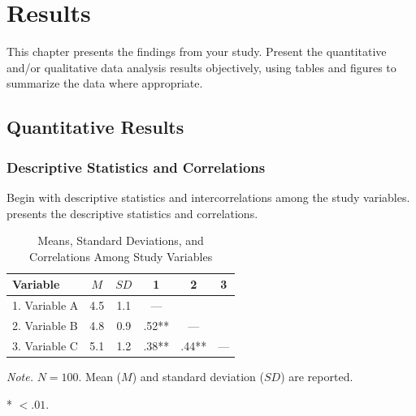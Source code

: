 
\section{Results}

This chapter presents the findings from your study. Present the quantitative and/or qualitative data analysis results objectively, using tables and figures to summarize the data where appropriate.

\subsection{Quantitative Results}

\subsubsection{Descriptive Statistics and Correlations}
Begin with descriptive statistics and intercorrelations among the study variables.  presents the descriptive statistics and correlations.

\begin{table}[htbp]
    \caption{Means, Standard Deviations, and Correlations Among Study Variables}
    \label{tab:descriptives}
    \begin{threeparttable}
        \begin{tabular}{lccccc}
            \toprule
            Variable & $M$ & $SD$ & 1 & 2 & 3 \\
            \midrule
            1. Variable A & 4.5 & 1.1 & --- & & \\
            2. Variable B & 4.8 & 0.9 & .52** & --- & \\
            3. Variable C & 5.1 & 1.2 & .38** & .44** & --- \\
            \bottomrule
        \end{tabular}
        \begin{tablenotes}[flushleft]
            \small
            \item \textit{Note.} $N = 100$. Mean ($M$) and standard deviation ($SD$) are reported.
            \item ** \pvalue{} $< .01$.
        \end{tablenotes}
    \end{threeparttable}
\end{table}


